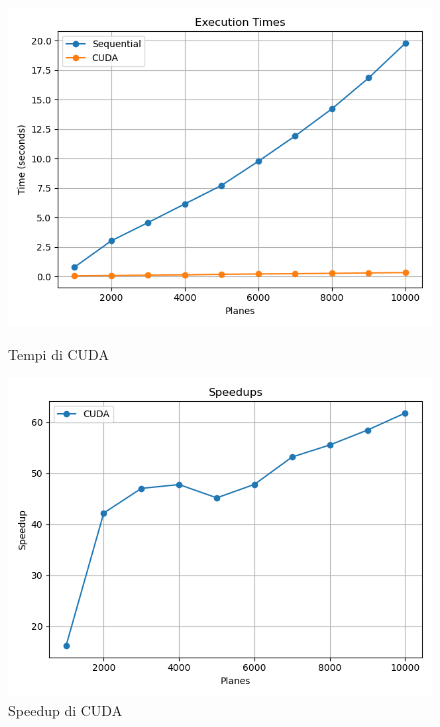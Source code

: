 \documentclass[11pt]{article}
\begin{document}
    \begin{figure}[H]
        \centering
        \begin{minipage}{0.49\textwidth}
            \centering
            \includegraphics[width=\textwidth]{plots/256/cuda_times}
            \caption{Tempi di CUDA}\label{fig:times-256-cuda}
        \end{minipage}
        \begin{minipage}{0.49\textwidth}
            \centering
            \includegraphics[width=\textwidth]{plots/256/cuda_speedup}
            \caption{Speedup di CUDA}\label{fig:speedup-256-cuda}
        \end{minipage}
    \end{figure}
\end{document}
